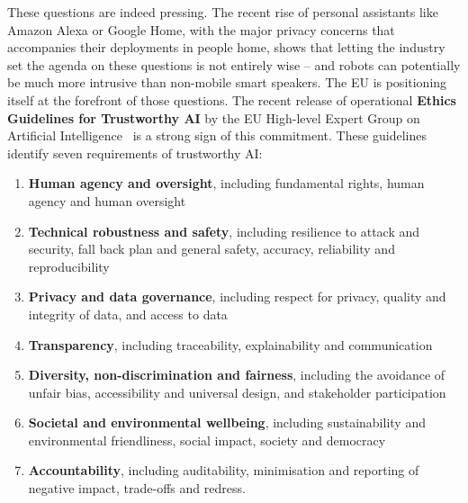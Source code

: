 These questions are indeed pressing. The recent rise of personal assistants like
Amazon Alexa or Google Home, with the major privacy concerns that accompanies
their deployments in people home, shows that letting the industry set the agenda
on these questions is not entirely wise -- and robots can potentially be much
more intrusive than non-mobile smart speakers.  The EU is positioning itself at
the forefront of those questions. The recent release of operational \textbf{Ethics
Guidelines for Trustworthy AI} by the EU High-level Expert Group on Artificial
Intelligence~\parencite{eu2019ethics} is a strong sign of this commitment. These
guidelines identify seven requirements of trustworthy AI:

\begin{enumerate}[label=\textbf{R\arabic*}]
    \item \textbf{Human agency and oversight}, including
            fundamental rights, human agency and human oversight

    \item \textbf{Technical robustness and safety}, including resilience to
        attack and security, fall back plan and general safety, accuracy,
        reliability and reproducibility

    \item \textbf{Privacy and data governance}, including respect for privacy,
        quality and integrity of data, and access to data

    \item \textbf{Transparency}, including traceability, explainability and
        communication

    \item \textbf{Diversity, non-discrimination and fairness}, including the
        avoidance of unfair bias, accessibility and universal design, and
        stakeholder participation

    \item \textbf{Societal and environmental wellbeing}, including
        sustainability and environmental friendliness, social impact, society
        and democracy

    \item \textbf{Accountability}, including auditability, minimisation and
        reporting of negative impact, trade-offs and redress.

\end{enumerate}

